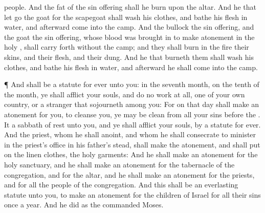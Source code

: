 {people.
And the
fat of the sin
offering shall he
burn upon the
altar.
And he that let
go the
goat for the
scapegoat shall
wash his
clothes, and
bathe his
flesh in
water, and
afterward
come into the
camp.
And the
bullock
{} the sin
offering, and the
goat
{} the sin
offering, whose
blood was brought
in to make
atonement in the
holy
{}, shall
{} carry
forth
without the
camp; and they shall
burn in the
fire their
skins, and their
flesh, and their
dung.
And he that
burneth them shall
wash his
clothes, and
bathe his
flesh in
water, and
afterward he shall
come into the
camp.
\par }{\PP {}¶ And
{} shall be a
statute for
ever unto you:
{} in the
seventh
month, on the
tenth
{} of the
month, ye shall
afflict your
souls, and
do no
work at all,
{} one of your own
country, or a
stranger that
sojourneth
among you:
For on that
day shall
{} make an
atonement for you, to
cleanse you,
{} ye may be
clean from all your
sins
before the
{}.
It
{} a
sabbath of
rest unto you, and ye shall
afflict your
souls, by a
statute for
ever.
And the
priest, whom he shall
anoint, and whom he shall
consecrate to minister in the
priest’s office in his
father’s stead, shall make the
atonement, and shall put
on the
linen
clothes,
{} the
holy
garments:
And he shall make an
atonement for the
holy
sanctuary, and he shall make an
atonement for the
tabernacle of the
congregation, and for the
altar, and he shall make an
atonement for the
priests, and for all the
people of the
congregation.
And this shall be an
everlasting
statute unto you, to make an
atonement for the
children of
Israel for all their
sins
once a
year. And he
did as the
{}
commanded
Moses.

}

